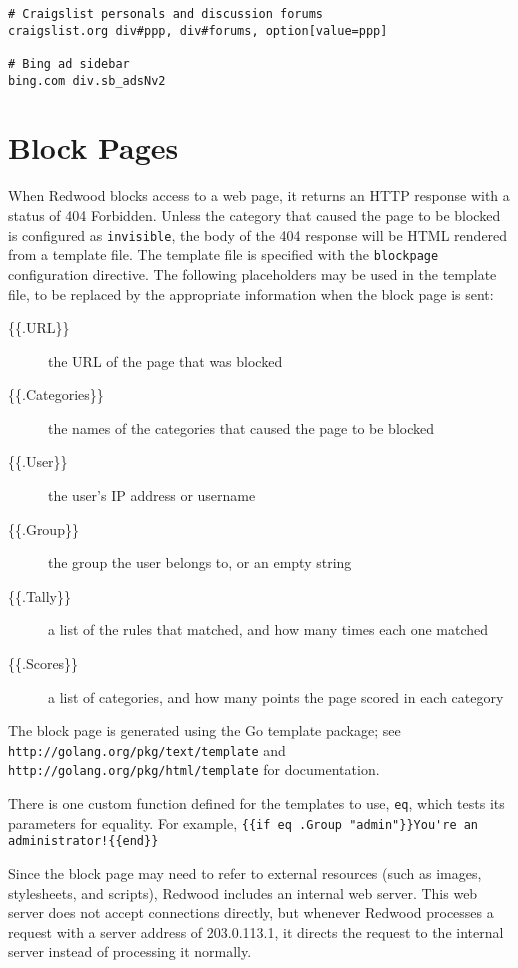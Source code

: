 \documentclass{article}
\begin{document}
\begin{verbatim}
# Craigslist personals and discussion forums
craigslist.org div#ppp, div#forums, option[value=ppp]

# Bing ad sidebar
bing.com div.sb_adsNv2
\end{verbatim}

\section{Block Pages}

When Redwood blocks access to a web page, 
it returns an HTTP response with a status of 404 Forbidden.
Unless the category that caused the page to be blocked is configured as \verb"invisible",
the body of the 404 response will be HTML rendered from a template file.
The template file is specified with the \verb"blockpage" configuration directive.
The following placeholders may be used in the template file, 
to be replaced by the appropriate information when the block page is sent:

\begin{description}

\item[\{\{.URL\}\}] the URL of the page that was blocked
\item[\{\{.Categories\}\}] the names of the categories that caused the page to be blocked
\item[\{\{.User\}\}] the user's IP address or username
\item[\{\{.Group\}\}] the group the user belongs to, or an empty string
\item[\{\{.Tally\}\}] a list of the rules that matched, and how many times each one matched
\item[\{\{.Scores\}\}] a list of categories, and how many points the page scored in each category

\end{description}

The block page is generated using the Go template package; see
\verb"http://golang.org/pkg/text/template"
and
\verb"http://golang.org/pkg/html/template"
for documentation.

There is one custom function defined for the templates to use, \verb"eq", 
which tests its parameters for equality.
For example, \verb[{{if eq .Group "admin"}}You're an administrator!{{end}}[

Since the block page may need to refer to external resources
(such as images, stylesheets, and scripts),
Redwood includes an internal web server.
This web server does not accept connections directly,
but whenever Redwood processes a request with a server address of 203.0.113.1,
it directs the request to the internal server instead of processing it normally.
\end{document}
